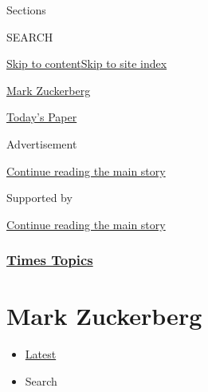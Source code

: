 Sections

SEARCH

\protect\hyperlink{site-content}{Skip to
content}\protect\hyperlink{site-index}{Skip to site index}

\href{https://www.nytimes3xbfgragh.onion/topic/person/mark-zuckerberg}{Mark
Zuckerberg}

\href{https://myaccount.nytimes3xbfgragh.onion/auth/login?response_type=cookie\&client_id=vi}{}

\href{https://www.nytimes3xbfgragh.onion/section/todayspaper}{Today's
Paper}

Advertisement

\protect\hyperlink{after-top}{Continue reading the main story}

Supported by

\protect\hyperlink{after-sponsor}{Continue reading the main story}

\hypertarget{times-topics}{%
\subsubsection{\texorpdfstring{\href{/index.html}{Times
Topics}}{Times Topics}}\label{times-topics}}

\hypertarget{mark-zuckerberg}{%
\section{Mark Zuckerberg}\label{mark-zuckerberg}}

\begin{itemize}
\tightlist
\item
  \protect\hyperlink{stream-panel}{Latest}
\item
  Search
\end{itemize}

